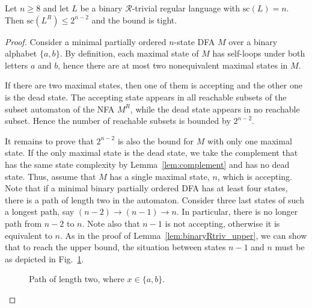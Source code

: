 \documentclass[runningheads]{llncs}
\newcommand{\R}{$\mathcal{R}$}
\renewcommand{\sc}{\mathrm{sc}}
\begin{document}
  \begin{lemma}\label{lem:eight}
    Let $n\ge8$ and let $L$ be a binary \R-trivial regular language with $\sc(L)=n$.
    Then $\sc(L^R)\le 2^{n-2}$ and the bound is tight.
  \end{lemma}
  \begin{proof}
    Consider a minimal partially ordered $n$-state DFA $M$
    over a binary alphabet $\{a,b\}$.
    By definition, each maximal state of $M$ has self-loops under both letters $a$ and $b$, hence there are at most two nonequivalent maximal states in $M$.
    
    If there are two maximal states,
    then one of them is accepting and the other one is the dead state.
    The accepting state appears in all reachable subsets
    of the subset automaton of the NFA $M^R$,
    while the dead state appears in no reachable subset.
    Hence the number of reachable subsets is bounded by $2^{n-2}$.
    
    It remains to prove that $2^{n-2}$ is also the bound for $M$ with only one maximal state.
    If the only maximal state is the dead state, we take the complement that has the same state complexity by Lemma~\ref{lem:complement}
    and has no dead state. 
    Thus, assume that $M$ has a single maximal state, $n$, which is accepting.
    Note that if a minimal binary partially ordered DFA has at least four states,
    there is a path of length two in the automaton.
    Consider three last states of such a longest path, say $(n-2) \to (n-1) \to n$.
    In particular, there is no longer path from $n-2$ to $n$.  
    Note also that $n-1$ is not accepting, otherwise it is equivalent to $n$.
    As in the proof of Lemma~\ref{lem:binaryRtriv_upper},
    we can show that to reach the upper bound,
    the situation between states $n-1$ and $n$ must be as depicted in Fig.~\ref{fig:bound4}.
    \begin{figure}[t]
      \centering
      \caption{Path of length two, where $x\in\{a,b\}$.}
      \label{fig:bound4}
    \end{figure}
    

\end{proof}
\end{document}
